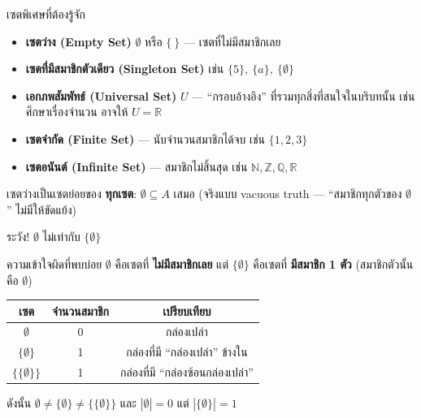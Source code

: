 \begin{frame}{เซตพิเศษที่ต้องรู้จัก}
  \begin{itemize}
    \item \textbf{เซตว่าง (Empty Set)} $\emptyset$ หรือ $\{\ \}$ --- เซตที่ไม่มีสมาชิกเลย
    \item \textbf{เซตที่มีสมาชิกตัวเดียว (Singleton Set)} เช่น $\{5\},\ \{a\},\ \{\emptyset\}$
    \item \textbf{เอกภพสัมพัทธ์ (Universal Set)} $U$ --- ``กรอบอ้างอิง'' ที่รวมทุกสิ่งที่สนใจในบริบทนั้น
          เช่น ศึกษาเรื่องจำนวน อาจให้ $U = \mathbb{R}$
    \item \textbf{เซตจำกัด (Finite Set)} --- นับจำนวนสมาชิกได้จบ เช่น $\{1,2,3\}$
    \item \textbf{เซตอนันต์ (Infinite Set)} --- สมาชิกไม่สิ้นสุด เช่น $\mathbb{N}, \mathbb{Z}, \mathbb{Q}, \mathbb{R}$
  \end{itemize}
  \vspace{0.4em}
  \begin{exampleblock}{}
    เซตว่างเป็นเซตย่อยของ \textbf{ทุกเซต}: $\emptyset \subseteq A$ เสมอ
    (จริงแบบ vacuous truth --- ``สมาชิกทุกตัวของ $\emptyset$'' ไม่มีให้ขัดแย้ง)
  \end{exampleblock}
\end{frame}

\begin{frame}{ระวัง! $\emptyset$ ไม่เท่ากับ $\{\emptyset\}$}
  \begin{alertblock}{ความเข้าใจผิดที่พบบ่อย}
    $\emptyset$ คือเซตที่ \textbf{ไม่มีสมาชิกเลย} \quad แต่ $\{\emptyset\}$ คือเซตที่ \textbf{มีสมาชิก 1 ตัว}
    (สมาชิกตัวนั้นคือ $\emptyset$)
  \end{alertblock}
  \vspace{0.4em}
  \begin{center}
  \begin{tabular}{|c|c|c|}
    \hline
    \textbf{เซต} & \textbf{จำนวนสมาชิก} & \textbf{เปรียบเทียบ} \\ \hline
    $\emptyset$ & 0 & กล่องเปล่า \\ \hline
    $\{\emptyset\}$ & 1 & กล่องที่มี ``กล่องเปล่า'' ข้างใน \\ \hline
    $\{\{\emptyset\}\}$ & 1 & กล่องที่มี ``กล่องซ้อนกล่องเปล่า'' \\ \hline
  \end{tabular}
  \end{center}
  \vspace{0.4em}
  ดังนั้น $\emptyset \neq \{\emptyset\} \neq \{\{\emptyset\}\}$ \quad และ $|\emptyset| = 0$ แต่ $|\{\emptyset\}| = 1$
\end{frame}


